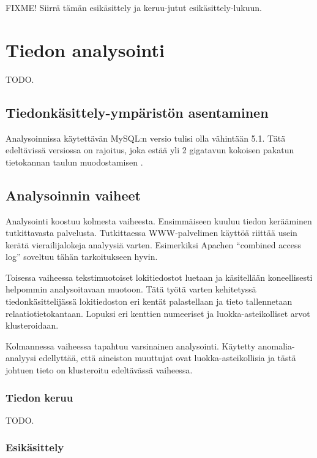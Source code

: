 
FIXME! Siirrä tämän esikäsittely ja keruu-jutut esikäsittely-lukuun.

\chapter{Tiedon analysointi}

TODO.

\section{Tiedonkäsittely-ympäristön asentaminen}

Analysoinnissa käytettävän MySQL:n versio tulisi olla vähintään
5.1. Tätä edeltävissä versiossa on rajoitus, joka estää yli 2 gigatavun
kokoisen pakatun tietokannan taulun muodostamisen \cite{archive2g}.

\section{Analysoinnin vaiheet}

Analysointi koostuu kolmesta vaiheesta. Ensimmäiseen kuuluu tiedon
kerääminen tutkittavasta palvelusta. Tutkittaessa WWW-palvelimen
käyttöä riittää usein kerätä vierailijalokeja analyysiä
varten. Esimerkiksi Apachen ``combined access log'' soveltuu tähän
tarkoitukseen hyvin.

Toisessa vaiheessa tekstimuotoiset lokitiedostot luetaan ja
käsitellään koneellisesti helpommin analysoitavaan
muotoon. Tätä työtä varten kehitetyssä tiedonkäsittelijässä
lokitiedoston eri kentät palastellaan ja tieto tallennetaan
relaatiotietokantaan. Lopuksi eri kenttien numeeriset ja
luokka-asteikolliset arvot klusteroidaan.

Kolmannessa vaiheessa tapahtuu varsinainen analysointi. Käytetty
anomalia-analyysi edellyttää, että aineiston muuttujat ovat
luokka-asteikollisia ja tästä johtuen tieto on klusteroitu edeltävässä vaiheessa.

\subsection{Tiedon keruu}

TODO.

\subsection{Esikäsittely}

